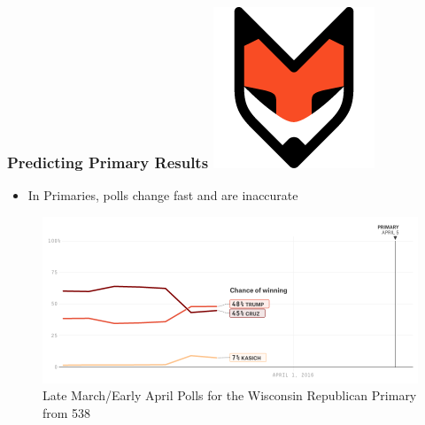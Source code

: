 \documentclass[xcolor=dvipsnames]{beamer}
\begin{document}
\begin{frame}
\frametitle{Predicting Primary Results \hfill \includegraphics[scale=.15]{fivethirtyeight-logo}}

\begin{itemize}
\item In Primaries, polls change fast and are inaccurate	
\end{itemize}


\begin{figure}
\includegraphics[scale=.35]{poll2.png}
\caption{Late March/Early April Polls for the Wisconsin Republican Primary from 538}
\end{figure}


\end{frame}
\end{document}
